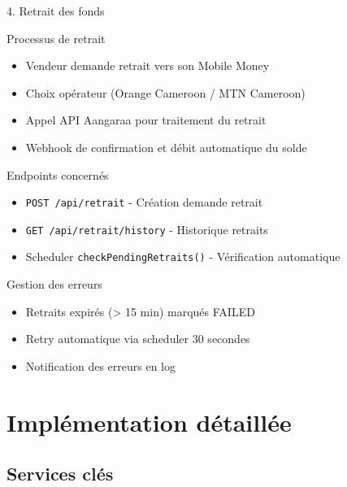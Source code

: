 \documentclass[aspectratio=169,9pt,demo]{beamer}
\begin{document}
\begin{frame}{4. Retrait des fonds}
\begin{block}{Processus de retrait}
\begin{itemize}
    \item Vendeur demande retrait vers son Mobile Money
    \item Choix opérateur (Orange Cameroon / MTN Cameroon)
    \item Appel API Aangaraa pour traitement du retrait
    \item Webhook de confirmation et débit automatique du solde
\end{itemize}
\end{block}

\begin{block}{Endpoints concernés}
\begin{itemize}
    \item \texttt{POST /api/retrait} - Création demande retrait
    \item \texttt{GET /api/retrait/history} - Historique retraits
    \item Scheduler \texttt{checkPendingRetraits()} - Vérification automatique
\end{itemize}
\end{block}

\begin{block}{Gestion des erreurs}
\begin{itemize}
    \item Retraits expirés (> 15 min) marqués FAILED
    \item Retry automatique via scheduler 30 secondes
    \item Notification des erreurs en log
\end{itemize}
\end{block}
\end{frame}

\section{\Large Implémentation détaillée}
\subsection{\large Services clés}
\end{document}
